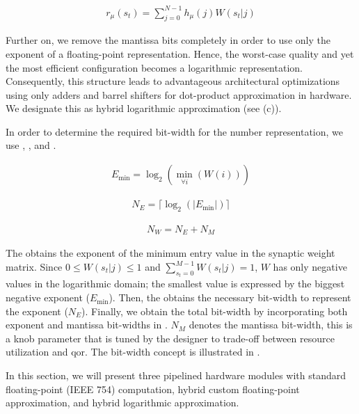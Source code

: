 \begin{eqnarray} \label{eq:dot_product}
r_{\mu}\left(s_t\right)=\sum_{j=0}^{N-1}h_{\mu}(j)W(s_t|j)
\end{eqnarray}

Further on, we remove the mantissa bits completely in order to use only the exponent of a floating-point representation. Hence, the worst-case quality and yet the most efficient configuration becomes a logarithmic representation. Consequently, this structure leads to advantageous architectural optimizations using only adders and barrel shifters for dot-product approximation in hardware. We designate this as hybrid logarithmic approximation (see {}(c)).

In order to determine the required bit-width for the number representation, we use {}, {}, and {}.

\begin{eqnarray} \label{eq:exp_max}
E_{\min}=\log _2(\min_{\forall i}(W(i)))
\end{eqnarray}

\begin{eqnarray} \label{eq:bits_exp}
N_E=\lceil\log_2(|E_{\min}|)\rceil
\end{eqnarray}

\begin{eqnarray} \label{eq:bits_bitwidth}
N_W=N_E + N_M
\end{eqnarray}


The  obtains the exponent of the minimum entry value in the synaptic weight matrix. Since $0\le W(s_t|j)\le1$ and $\sum_{s_t=0}^{M-1}W(s_t|j)=1$, $W$ has only negative values in the logarithmic domain; the smallest value is expressed by the biggest negative exponent ($E_{\min}$). Then, the {} obtains the necessary bit-width to represent the exponent ($N_E$). Finally, we obtain the total bit-width by incorporating both exponent and mantissa bit-widths in {}. $N_M$ denotes the mantissa bit-width, this is a knob parameter that is tuned by the designer to trade-off between resource utilization and \gls{qor}. The bit-width concept is illustrated in {}.

In this section, we will present three pipelined hardware modules with standard floating-point (IEEE 754) computation, hybrid custom floating-point approximation, and hybrid logarithmic approximation.

